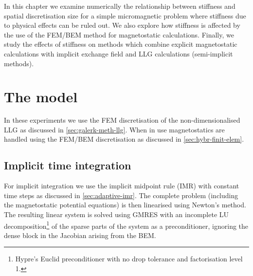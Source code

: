 In this chapter we examine numerically the relationship between stiffness and spatial discretisation size for a simple micromagnetic problem where stiffness due to physical effects can be ruled out.
We also explore how stiffness is affected by the use of the FEM/BEM method for magnetostatic calculations.
Finally, we study the effects of stiffness on methods which combine explicit magnetostatic calculations with implicit exchange field and LLG calculations (\ie semi-implicit methods).

\section{The model}

In these experiments we use the FEM discretisation of the non-dimensionalised LLG as discussed in \autoref{sec:galerk-meth-llg}.
When in use magnetostatics are handled using the FEM/BEM discretisation as discussed in \autoref{sec:hybr-finit-elem}.

\subsection{Implicit time integration}
For implicit integration we use the implicit midpoint rule (IMR) with constant time steps as discussed in \autoref{sec:adaptive-imr}.
The complete problem (including the magnetostatic potential equations) is then linearised using Newton's method.
The resulting linear system is solved using GMRES with an incomplete LU decomposition\footnote{Hypre's Euclid preconditioner\cite{hypre} with no drop tolerance and factorisation level 1.} of the sparse parts of the system as a preconditioner, ignoring the dense block in the Jacobian arising from the BEM.

